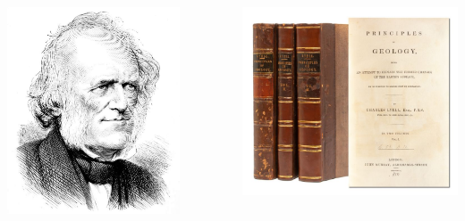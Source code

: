 \documentclass[10pt]{beamer}
\begin{document}
\begin{frame}
	\begin{columns}
		\begin{column}{0.5\textwidth}
			\begin{center}
				\includegraphics[width=0.8\textwidth]{figures/Lyell.jpg}
			\end{center}
		\end{column}
		
		\begin{column}{0.5\textwidth}
			\begin{center}
				\includegraphics[width=1.0\textwidth]{figures/lyell-principles.jpg}
			\end{center}
		\end{column}
	\end{columns}
\end{frame}  
\end{document}
